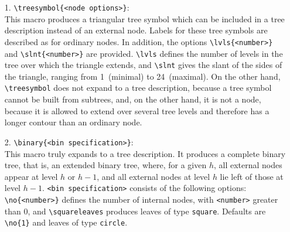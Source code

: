 \begin{enumerate}                                                               
\item[1.] \verb.\treesymbol{<node options>}.:\\                                 
     This macro produces a triangular tree symbol which can be included in      
     a tree description instead of an external node. Labels for these           
     tree symbols are described as for ordinary nodes. In addition, the         
     options \verb.\lvls{<number>}. and \verb.\slnt{<number>}.                  
     are provided. \verb.\lvls. defines the number of levels in the             
     tree over which the triangle extends, and \verb.\slnt. gives               
     the slant of the sides of the triangle, ranging from 1~(minimal)           
     to 24~(maximal). On the other hand,                                        
     \verb.\treesymbol. does not expand to a tree description, because          
     a tree symbol cannot be built from subtrees, and, on the other hand,       
     it is not a node, because it is allowed to extend over several tree        
     levels and therefore has a longer contour than an ordinary node.           
                                                                                
\item[2.] \verb.\binary{<bin specification>}.:\\                                
     This macro truly expands to a tree description. It produces                
     a complete binary tree, that is, an extended binary tree,                  
     where, for a given $h$, all external nodes appear at level $h$             
     or $h-1$, and all external nodes at level $h$ lie left of those at         
     level $h-1$. \verb.<bin specification>. consists of the                    
     following options:                                                         
     \verb.\no{<number>}. defines the number of internal nodes,                 
     with \verb.<number>. greater than 0, and                                   
     \verb.\squareleaves. produces leaves of type                               
     \verb.square.. Defaults are \verb.\no{1}. and                              
     leaves of type \verb.circle..                                              
                                                                                

\end{enumerate}
